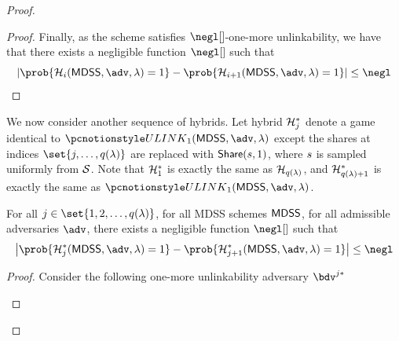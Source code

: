 \begin{proof}
\begin{proof}
		Finally, as the scheme satisfies $\negl[]$-one-more unlinkability, we have that there exists a negligible function $\negl[]$ such that
		$$
			\left| \prob{\hyb_i(\mdss, \adv, \secpar) =1} - \prob{\hyb_{i + 1}(\mdss, {\adv}, \secpar) = 1} \right| \leq \negl
		$$
	\end{proof}

	We now consider another sequence of hybrids.
	Let hybrid $\mathcal{H}_j^*$ denote a game identical to $\ulink_1(\mdss, \adv, \secpar)$ except the shares at indices $\set{j, \dots, q(\secpar)}$ are replaced with $\mathsf{Share}(s, 1)$, where $s$ is sampled uniformly from $\mathcal{S}$.
	Note that $\mathcal{H}_1^*$ is exactly the same as $\mathcal{H}_{q(\lambda)}$, and $\mathcal{H}_{q(\lambda) + 1}^*$ is exactly the same as $\ulink_1(\mdss, \adv, \secpar)$.

	\begin{claim}
		For all $j \in \set{1, 2, \dots, q(\secpar)}$, for all MDSS schemes $\mathsf{MDSS}$, for all admissible adversaries $\adv$, there exists a negligible function $\negl[]$ such that
		$$
			\left| \prob{\hyb_j^*(\mdss, \adv, \secpar)= 1} - \prob{\hyb_{j + 1}^*(\mdss, \adv, \secpar)= 1} \right| \leq \negl
		$$
	\end{claim}

	\begin{proof}

		Consider the following one-more unlinkability adversary $\bdv^{j*}$
		\begin{pcvstack}[center, space=1em]


\end{pcvstack}
\end{proof}
\end{proof}
